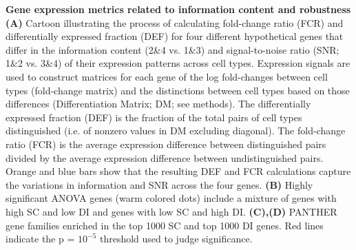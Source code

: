 \textbf{Gene expression metrics related to information content and robustness} \textbf{(A)} Cartoon illustrating the process of calculating fold-change ratio (FCR) and differentially expressed fraction (DEF) for four different hypothetical genes that differ in the information content (2\&4 vs. 1\&3) and signal-to-noise ratio (SNR; 1\&2 vs. 3\&4) of their expression patterns across cell types. Expression signals are used to construct matrices for each gene of the log fold-changes between cell types (fold-change matrix) and the distinctions between cell types based on those differences (Differentiation Matrix; DM; see methods). The differentially expressed fraction (DEF) is the fraction of the total pairs of cell types distinguished (i.e. of nonzero values in DM excluding diagonal). The fold-change ratio (FCR) is the average expression difference between distinguished pairs divided by the average expression difference between undistinguished pairs. Orange and blue bars show that the resulting DEF and FCR calculations capture the variations in information and SNR across the four genes. \textbf{(B)} Highly significant ANOVA genes (warm colored dots) include a mixture of genes with high SC and low DI and genes with low SC and high DI. \textbf{(C),(D)} PANTHER gene families enriched in the top 1000 SC and top 1000 DI genes. Red lines indicate the p = $10^{-5}$ threshold used to judge significance.